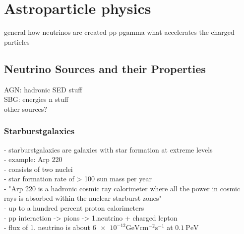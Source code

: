 \chapter{Astroparticle physics} \label{sec:astro}

general how neutrinos are created pp pgamma
what accelerates the charged particles


\section{Neutrino Sources and their Properties}

AGN: hadronic SED stuff\\
SBG: energies n stuff\\
other sources?

\subsection{Starburstgalaxies}
- starburstgalaxies are galaxies with star formation at extreme levels\\
- example: Arp 220\\
- consists of two nuclei\\
- star formation rate of > 100 sun mass per year\\
- "Arp 220 is a hadronic cosmic ray calorimeter where all the power in cosmic rays is absorbed within the nuclear starburst zones"\\
- up to a hundred percent proton calorimeters\\
- pp interaction -> pions -> 1.neutrino + charged lepton\\
- flux of 1. neutrino is about $\num{6e-12}\si{\giga\electronvolt\centi\meter\tothe{-2}\second\tothe{-1}}$ at $\SI{0.1}{\peta\electronvolt}$\\
\cite{starburst}
